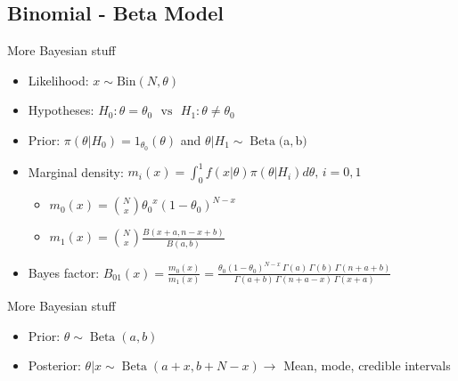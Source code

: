 \subsection{Binomial - Beta Model}


\begin{frame}{More Bayesian stuff}

\begin{itemize}

\item Likelihood: $x \sim \text{Bin}(N, \theta)$

\item  Hypotheses: $ H_0: {\theta}={\theta_0} \,\,\,\, \text{vs} \,\,\,\,  H_1: {\theta} \neq \theta_0$

\item Prior: $\pi(\theta|H_0)={1_{\theta_0}(\theta)}$ and $\theta| H_1 \sim \operatorname{Beta}($a$,$b$) $

\item Marginal density: $m_i(x)= \int_0^1 f(x|\theta)\pi(\theta|H_i)d \theta, \,  i=0, 1$

\begin{itemize}

\item $m_0(x)=\binom{N}{x} {\theta_0}^{x}{(1-\theta_0)}^{N-x}$ 

\item  $m_1(x) = \binom{N}{x}\frac{B(x+a, n-x+b)}{B(a,b)}$

\end{itemize}

\item Bayes factor: $B_{01}(x) = \frac{m_0(x)}{m_1(x)}  = \frac{\theta_0(1-\theta_0)^{N-x}\,\Gamma(a)\,\Gamma(b)\,\Gamma(n+a+b)}{\Gamma(a+b)\,\Gamma(n+a-x)\,\Gamma(x+a)}$ 

\end{itemize}

\end{frame}


\begin{frame}{More Bayesian stuff}

\begin{itemize}

\item Prior: $\theta \sim \operatorname{Beta}(a,b) $

\item Posterior: $\theta | x \sim \operatorname{Beta}(a+x, b+N-x ) \rightarrow$ Mean, mode, credible intervals

\end{itemize}

\end{frame}


